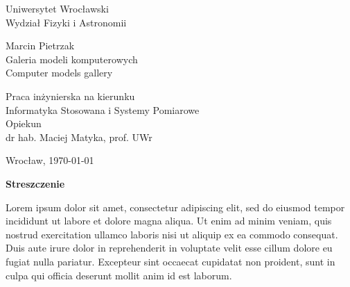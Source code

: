 \documentclass[a4paper,12pt,reqno]{article}
\begin{document}


\begin{center}

\thispagestyle{empty}

\Large 
Uniwersytet Wrocławski\\
Wydział Fizyki i Astronomii\\
\vspace{0.8cm}
\vspace{1.8cm}

\Large Marcin Pietrzak \\
\vspace{3.2cm}
\Large Galeria modeli komputerowych \\
\vspace{1.5cm}
Computer models gallery
\end{center}
\vspace{3.7cm}
\begin{flushright}

\large{ Praca inżynierska na kierunku \\Informatyka Stosowana i Systemy Pomiarowe \\}
\vspace{0.5cm}
\large{ Opiekun \\ dr hab. Maciej Matyka, prof. UWr}
\end{flushright}
\vspace{2.2cm}

\begin{center}
\large Wrocław, \today
\end{center}

\newpage

\tableofcontents

\newpage

\begin{flushleft}
\Large \textbf{Streszczenie}
\end{flushleft}
\vspace{1cm}


 Lorem ipsum dolor sit amet, consectetur adipiscing elit, sed do eiusmod tempor incididunt ut labore et dolore magna aliqua. Ut enim ad minim veniam, quis nostrud exercitation ullamco laboris nisi ut aliquip ex ea commodo consequat. Duis aute irure dolor in reprehenderit in voluptate velit esse cillum dolore eu fugiat nulla pariatur. Excepteur sint occaecat cupidatat non proident, sunt in culpa qui officia deserunt mollit anim id est laborum.
\end{document}
